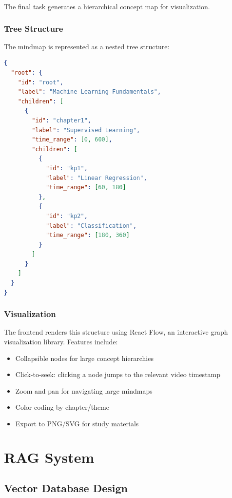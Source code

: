 \documentclass[12pt,a4paper]{article}
\begin{document}
The final task generates a hierarchical concept map for visualization.

\subsubsection{Tree Structure}

The mindmap is represented as a nested tree structure:

\begin{lstlisting}[language=json, caption={Mindmap JSON Structure}]
{
  "root": {
    "id": "root",
    "label": "Machine Learning Fundamentals",
    "children": [
      {
        "id": "chapter1",
        "label": "Supervised Learning",
        "time_range": [0, 600],
        "children": [
          {
            "id": "kp1",
            "label": "Linear Regression",
            "time_range": [60, 180]
          },
          {
            "id": "kp2",
            "label": "Classification",
            "time_range": [180, 360]
          }
        ]
      }
    ]
  }
}
\end{lstlisting}

\subsubsection{Visualization}

The frontend renders this structure using React Flow, an interactive graph visualization library. Features include:

\begin{itemize}
    \item Collapsible nodes for large concept hierarchies
    \item Click-to-seek: clicking a node jumps to the relevant video timestamp
    \item Zoom and pan for navigating large mindmaps
    \item Color coding by chapter/theme
    \item Export to PNG/SVG for study materials
\end{itemize}

\newpage

\section{RAG System}
\label{sec:rag}

\subsection{Vector Database Design}
\end{document}

